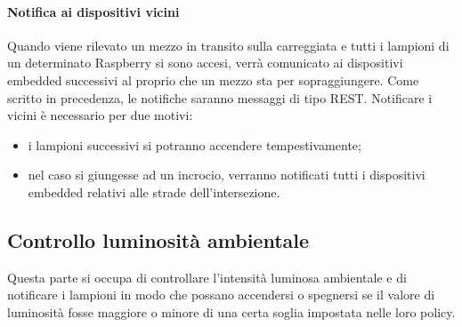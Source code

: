 \paragraph{Notifica ai dispositivi vicini}
Quando viene rilevato un mezzo in transito sulla carreggiata e tutti i lampioni di un determinato Raspberry si sono accesi, verrà comunicato ai dispositivi embedded successivi al proprio che un mezzo sta per sopraggiungere.
Come scritto in precedenza, le notifiche saranno messaggi di tipo REST.
Notificare i vicini è necessario per due motivi:
\begin{itemize}
	\item i lampioni successivi si potranno accendere tempestivamente;
	\item nel caso si giungesse ad un incrocio, verranno notificati tutti i dispositivi embedded relativi alle strade dell'intersezione.
\end{itemize}
\newpage
\subsection{Controllo luminosità ambientale}
Questa parte si occupa di controllare l'intensità luminosa ambientale e di notificare i lampioni in modo che possano accendersi o spegnersi se il valore di luminosità fosse maggiore o minore di una certa soglia impostata nelle loro policy.
